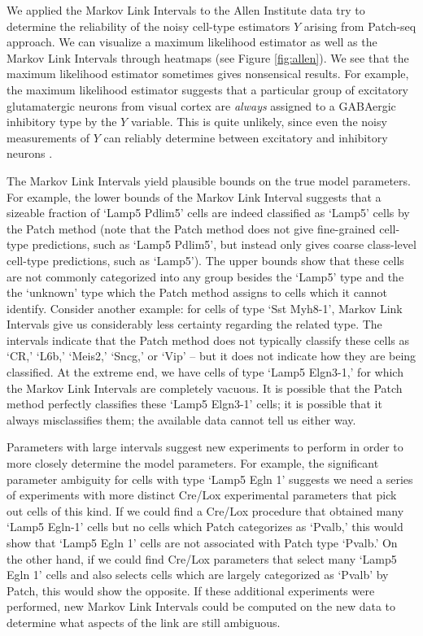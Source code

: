 \documentclass{article}
\theoremstyle{definition}
\begin{document}
We applied the Markov Link Intervals to the Allen Institute data try to determine the reliability of the noisy cell-type estimators $Y$ arising from Patch-seq approach.  We can visualize a maximum likelihood estimator as well as the Markov Link Intervals through heatmaps (see Figure \ref{fig:allen}).  We see that the maximum likelihood estimator sometimes gives nonsensical results.  For example, the maximum likelihood estimator suggests that a particular group of excitatory glutamatergic neurons from visual cortex are \emph{always} assigned to a GABAergic inhibitory type by the $Y$ variable.  This is quite unlikely, since even the noisy measurements of $Y$ can reliably determine between excitatory and inhibitory neurons \cite{cadwell2016electrophysiological,cadwell2017multimodal}. 

The Markov Link Intervals yield plausible bounds on the true model parameters.  For example, the lower bounds of the Markov Link Interval suggests that a sizeable fraction of `Lamp5 Pdlim5' cells are indeed classified as `Lamp5' cells by the Patch method (note that the Patch method does not give fine-grained cell-type predictions, such as `Lamp5 Pdlim5', but instead only gives coarse class-level cell-type predictions, such as `Lamp5').  The upper bounds show that these cells are not commonly categorized into any group besides the `Lamp5' type and the the `unknown' type which the Patch method assigns to cells which it cannot identify.  Consider another example: for cells of type `Sst Myh8-1',  Markov Link Intervals give us considerably less certainty regarding the related type.  The intervals indicate that the Patch method does not typically classify these cells as `CR,' `L6b,' `Meis2,' `Sncg,' or `Vip' -- but it does not indicate how they are being classified.  At the extreme end, we have cells of type `Lamp5 Elgn3-1,' for which the Markov Link Intervals are completely vacuous.   It is possible that the Patch method perfectly classifies these `Lamp5 Elgn3-1' cells; it is possible that it always misclassifies them; the available data cannot tell us either way.  

Parameters with large intervals suggest new experiments to perform in order to more closely determine the model parameters.  For example, the significant parameter ambiguity for cells with type `Lamp5 Egln 1' suggests we need a series of experiments with more distinct Cre/Lox experimental parameters that pick out cells of this kind.  If we could find a Cre/Lox procedure that obtained many `Lamp5 Egln-1' cells but no cells which Patch categorizes as `Pvalb,' this would show that `Lamp5 Egln 1' cells are not associated with Patch type `Pvalb.'  On the other hand, if we could find Cre/Lox parameters that select many `Lamp5 Egln 1' cells and also selects cells which are largely categorized as `Pvalb' by Patch, this would show the opposite.  If these additional experiments were performed, new Markov Link Intervals could be computed on the new data to determine what aspects of the link are still ambiguous.  
\end{document}
